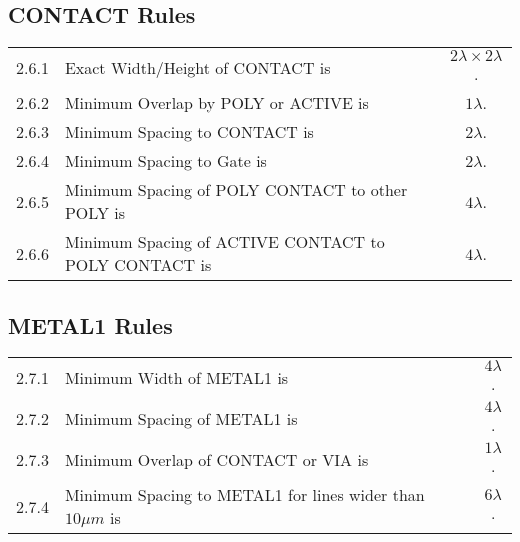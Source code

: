 \documentclass[10pt,a4paper,oneside]{article}
\newcounter{ct}
\begin{document}
\subsection{CONTACT Rules}\label{design_rules_contact_rules}

\begin{flushleft}
    \begin{tabular}{c l c}
        2.6.1   & Exact Width/Height of CONTACT is & $ 2 \lambda \times 2 \lambda$. \\
        2.6.2   & Minimum Overlap by POLY or ACTIVE is & $1 \lambda$. \\
        2.6.3   & Minimum Spacing to CONTACT is & $2 \lambda$. \\
        2.6.4   & Minimum Spacing to Gate is & $2 \lambda$. \\
        2.6.5   & Minimum Spacing of POLY CONTACT to other POLY is & $4 \lambda$. \\
        2.6.6   & Minimum Spacing of ACTIVE CONTACT to POLY CONTACT is & $4 \lambda$. \\
    \end{tabular}
\end{flushleft}

\subsection{METAL1 Rules}\label{design_rules_metal1_rules}

\begin{center}
\end{center}

\begin{flushleft}
    \begin{tabular}{c l c}
        2.7.1   & Minimum Width of METAL1 is & $4 \lambda$. \\
        2.7.2   & Minimum Spacing of METAL1 is & $4 \lambda$. \\
        2.7.3   & Minimum Overlap of CONTACT or VIA is & $1 \lambda$. \\
        2.7.4   & Minimum Spacing to METAL1 for lines wider than $10 \mu m$ is & $6 \lambda$. \\
    \end{tabular}
\end{flushleft}
\end{document}
